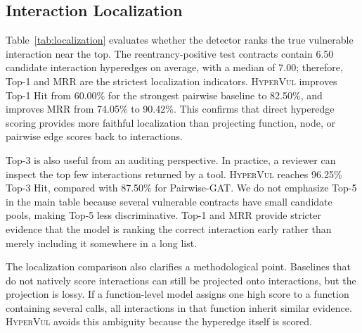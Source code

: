 \documentclass[conference]{IEEEtran}
\newcommand{\tool}{\textsc{HyperVul}}
\begin{document}
\subsection{Interaction Localization}

Table~\ref{tab:localization} evaluates whether the detector ranks the true vulnerable interaction near the top. The reentrancy-positive test contracts contain 6.50 candidate interaction hyperedges on average, with a median of 7.00; therefore, Top-1 and MRR are the strictest localization indicators. \tool{} improves Top-1 Hit from 60.00\% for the strongest pairwise baseline to 82.50\%, and improves MRR from 74.05\% to 90.42\%. This confirms that direct hyperedge scoring provides more faithful localization than projecting function, node, or pairwise edge scores back to interactions.

Top-3 is also useful from an auditing perspective. In practice, a reviewer can inspect the top few interactions returned by a tool. \tool{} reaches 96.25\% Top-3 Hit, compared with 87.50\% for Pairwise-GAT. We do not emphasize Top-5 in the main table because several vulnerable contracts have small candidate pools, making Top-5 less discriminative. Top-1 and MRR provide stricter evidence that the model is ranking the correct interaction early rather than merely including it somewhere in a long list.

The localization comparison also clarifies a methodological point. Baselines that do not natively score interactions can still be projected onto interactions, but the projection is lossy. If a function-level model assigns one high score to a function containing several calls, all interactions in that function inherit similar evidence. \tool{} avoids this ambiguity because the hyperedge itself is scored.
\end{document}
